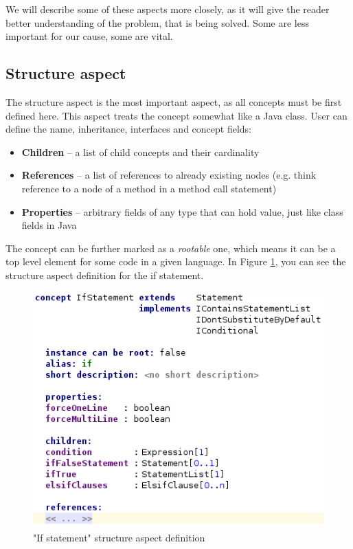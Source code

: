 We will describe some of these aspects more closely, as it will give the reader better understanding of the problem, that is being solved.
Some are less important for our cause, some are vital.

\subsection{Structure aspect}

The structure aspect is the most important aspect, as all concepts must be first defined here.
This aspect treats the concept somewhat like a Java class.
User can define the name, inheritance, interfaces and concept fields:

\begin{itemize}
	\item \textbf{Children} -- a list of child concepts and their cardinality

	\item \textbf{References} -- a list of references to already existing nodes (e.g. think reference to a node of a method in a method call statement)

	\item \textbf{Properties} -- arbitrary fields of any type that can hold value, just like class fields in Java
\end{itemize}

The concept can be further marked as a \textit{rootable} one, which means it can be a top level element for some code in a given language.
In Figure \ref{fig:if_statement_structure}, you can see the structure aspect definition for the if statement.

\begin{figure}[h]
	\centering
	\includegraphics[scale=0.75]{./img/if_statement_structure.png}
	\caption{"If statement" structure aspect definition}
	\label{fig:if_statement_structure}
\end{figure}

